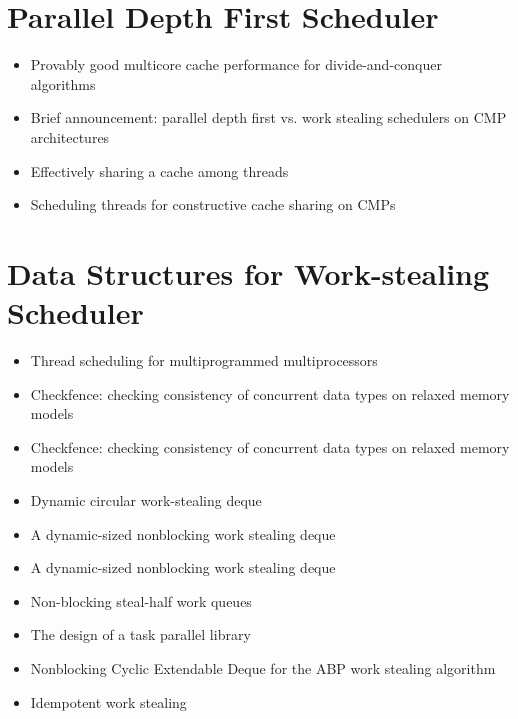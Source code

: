 \section{Parallel Depth First Scheduler}
\label{sec:lr-parallel-depth-first-scheduler}

\begin{itemize}
\item Provably good multicore cache performance for divide-and-conquer
  algorithms \cite{Blelloch2008}
\item Brief announcement: parallel depth first vs. work stealing
  schedulers on CMP architectures \cite{Liaskovitis2006}
\item Effectively sharing a cache among threads \cite{Blelloch2004}
\item Scheduling threads for constructive cache sharing on CMPs
  \cite{Chen2007}
\end{itemize}


\section{Data Structures for Work-stealing Scheduler}
\label{sec:lr-data-structures-for-work-stealing-scheduler}

\begin{itemize}
\item Thread scheduling for multiprogrammed multiprocessors
  \cite{Arora2001}
\item Checkfence: checking consistency of concurrent data types on
  relaxed memory models \cite{Burckhardt2007}
\item Checkfence: checking consistency of concurrent data types on
  relaxed memory models \cite{Burckhardt2007a}
\item Dynamic circular work-stealing deque \cite{Chase2005}
\item A dynamic-sized nonblocking work stealing deque
  \cite{Hendler2006}
\item A dynamic-sized nonblocking work stealing deque
  \cite{Hendler2006a}
\item Non-blocking steal-half work queues \cite{Hendler2002}
\item The design of a task parallel library \cite{Leijen2009}
\item Nonblocking Cyclic Extendable Deque for the ABP work stealing
  algorithm \cite{Lev2005}
\item Idempotent work stealing \cite{Michael2009}
\end{itemize}


